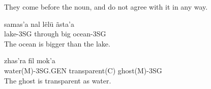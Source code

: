 
They come before the noun, and do not agree with it in any way.


\begin{exe}
\ex\label{exe:comparatives-more}
\gll samas’a nal lëlü ãsta’a\\
lake-3SG through big ocean-3SG\\
\trans The ocean is bigger than the lake.
\end{exe}

\begin{exe}
\ex\label{exe:comparatives-equal}
\gll zhas’ra fil mok’a\\
water(M)-3SG.GEN transparent(C) ghost(M)-3SG\\
\trans The ghost is transparent as water.
\end{exe}

